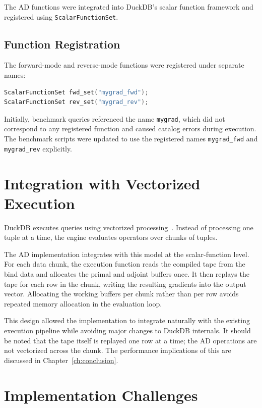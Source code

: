 \documentclass[12pt]{report}
\begin{document}
The AD functions were integrated into DuckDB's scalar function framework and registered using \texttt{ScalarFunctionSet}.

\subsection{Function Registration}

The forward-mode and reverse-mode functions were registered under separate names:

\begin{lstlisting}[language=C++]
ScalarFunctionSet fwd_set("mygrad_fwd");
ScalarFunctionSet rev_set("mygrad_rev");
\end{lstlisting}

Initially, benchmark queries referenced the name \texttt{mygrad}, which did not correspond to any registered function and caused catalog errors during execution. The benchmark scripts were updated to use the registered names \texttt{mygrad\_fwd} and \texttt{mygrad\_rev} explicitly.

\section{Integration with Vectorized Execution}

DuckDB executes queries using vectorized processing~\cite{duckdb2019}. Instead of processing one tuple at a time, the engine evaluates operators over chunks of tuples.

The AD implementation integrates with this model at the scalar-function level. For each data chunk, the execution function reads the compiled tape from the bind data and allocates the primal and adjoint buffers once. It then replays the tape for each row in the chunk, writing the resulting gradients into the output vector. Allocating the working buffers per chunk rather than per row avoids repeated memory allocation in the evaluation loop.

This design allowed the implementation to integrate naturally with the existing execution pipeline while avoiding major changes to DuckDB internals. It should be noted that the tape itself is replayed one row at a time; the AD operations are not vectorized across the chunk. The performance implications of this are discussed in Chapter~\ref{ch:conclusion}.

\section{Implementation Challenges}
\end{document}
